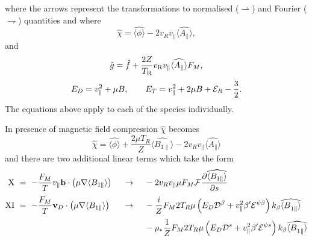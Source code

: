 where the arrows represent the transformations to normalised ($\rightharpoonup$) and Fourier ($\rightharpoondown$)  quantities and where 
\begin{equation} 
\label{eq:chi-normalized}
\hat \chi = \widehat {\langle \phi \rangle} - 2 v_{R} v_{\parallel} \widehat{\langle A_{\parallel} \rangle},
\end{equation} 
and 
\begin{equation} 
\hat g = \hat f + {2 Z \over T_{\rm R}} v_{\rm R} v_{\parallel} \widehat{\langle A_{\parallel} \rangle} F_{M}, 
\end{equation}
\begin{equation}
E_D = v_{\parallel}^2 + \mu B , \qquad 
E_T = v_{\parallel}^2 + 2 \mu B + \mathcal{E}_R - {3\over 2} .
\end{equation}
The equations above apply to each of the species individually.  

In presence of magnetic field compression $\hat \chi$ becomes
\begin{equation}
	 \hat \chi = \widehat {\langle \phi \rangle}  + \frac{2 \mu T_R}{Z} \widehat{\langle {B}_{1\parallel} \rangle} - 2 v_{R} v_{\parallel} \widehat{\langle A_{\parallel} \rangle}
\end{equation}
and there are two additional linear terms which take the form
\begin{alignat}{3}
\label{eq:X} {\rm X} &\ =\ -\frac{F_M}{T} v_{\parallel} \mathbf{b} \cdot \left( \mu \nabla \langle {B}_{1\parallel} \rangle \right) & &\ \to\ & &-2 v_R v_{\parallel} \mu F_{M} \mathcal{F} \pd{\widehat{\langle{B}_{1\parallel}\rangle}}{s} \\
\noalign{\vskip 0.1 truecm}
\label{eq:XI} {\rm XI} &\ =\ -\frac{F_M}{T} \mathbf{v}_D \cdot \left( \mu \nabla \langle{B}_{1\parallel} \rangle \right) & &\ \to\ & &-\frac{i}{Z} F_{M} 2 T_R  \mu \left( E_D \mathcal{D}^{\beta} + v_{\parallel}^2 \beta^\prime \mathcal{E}^{\psi \beta} \right) k_{\beta} \widehat{{\langle{B}}_{1\parallel}\rangle} \\
\noalign{\vskip 0.1 truecm}
&&&&& -\rho_*\frac{1}{Z} F_{M} 2 T_R \mu \left( E_D \mathcal{D}^{s} + v_{\parallel}^2 \beta^\prime \mathcal{E}^{\psi s} \right) k_{\beta} \widehat{{\langle{B}}_{1\parallel}\rangle} \nonumber
\end{alignat}

